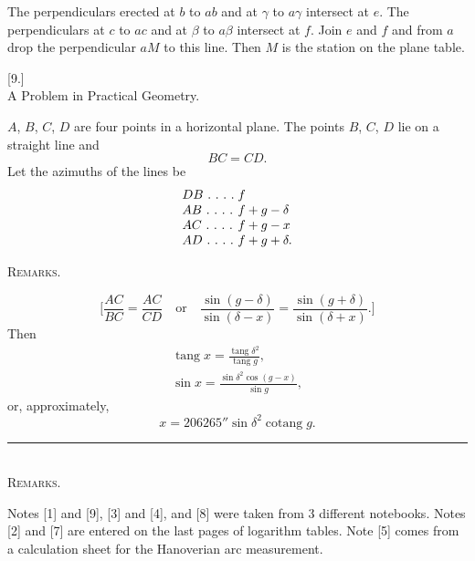 The perpendiculars erected at $b$ to $ab$ and at $\gamma$ to $a\gamma$ intersect at $e$. The perpendiculars at $c$ to $ac$ and at $\beta$ to $a\beta$ intersect at $f$. Join $e$ and $f$ and from $a$ drop the perpendicular $aM$ to this line. Then $M$ is the station on the plane table.
\bigskip
\begin{center}[9.]\\[5pt]A Problem in Practical Geometry.\end{center}
$A$, $B$, $C$, $D$ are four points in a horizontal plane. The points $B$, $C$, $D$ lie on a straight line and
\[
BC=CD.
\]
Let the azimuths of the lines be
\[
\begin{array}{l@{\;}l}
DB\ .\ .\ .\ .&f\\
AB\ .\ .\ .\ .&f+g-\delta\\
AC\ .\ .\ .\ .&f+g-x\\
AD\ .\ .\ .\ .&f+g+\delta.
\end{array}
\]
\begin{center}
\end{center}

\clearpage
{}\hfill\textsc{Remarks.}\hfill\mbox{}\par\medskip
\[
\bigg[\frac{AC}{BC}=\frac{AC}{CD}\quad\text{or}\quad
\frac{\sin(g-\delta)}{\sin(\delta-x)}=\frac{\sin(g+\delta)}{\sin(\delta+x)}.\bigg]
\]
Then
\[
\begin{gathered}
\operatorname{tang}x=\frac{\operatorname{tang}\delta^2}{\operatorname{tang}g},\\[6pt]
\sin x=\frac{\sin\delta^2\cos(g-x)}{\sin g},
\end{gathered}
\]
or, approximately,
\[
x=206265''\sin\delta^2\operatorname{cotang}g.
\]
\bigskip
\begin{center}\rule{3cm}{.4pt}\\[6pt]\textsc{Remarks.}\end{center}
\begingroup\footnotesize
Notes [1] and [9], [3] and [4], and [8] were taken from 3 different notebooks. Notes [2] and [7] are entered on the last pages of logarithm tables. Note [5] comes from a calculation sheet for the Hanoverian arc measurement.

